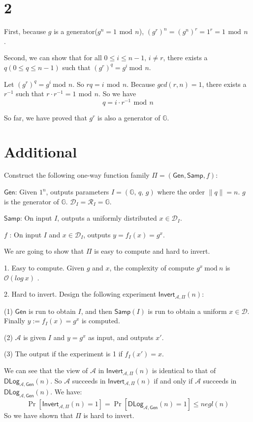 \documentclass[a4papers]{ctexart}
\newcommand{\mc}[1]{\mathcal{#1}}
\newcommand{\mr}[1]{\ \mathrm{#1}\ }
\newcommand{\mb}[1]{\mathbb{#1}}
\begin{document}
\section*{2}
First, because $g$ is a generator($g^n = 1\, \mr{mod}\, n $), $(g^r)^n = (g^n)^r = 1^r = 1\, \mr{mod}\, n$ .

Second, we can show that for all $0\le i \le n-1,\, i\ne r$, there exists a $q(0\le q \le n-1)$ such that $(g^r)^q = g^i \mr{mod}\, n$.

Let $(g^r)^q = g^i \mr{mod}\, n$. So $rq = i\, \mr{mod}\, n$. Because $gcd(r,n)=1$, there exists a $r^{-1}$
such that $r\cdot r^{-1} = 1\, \mr{mod}\, n$. So we have
\[ q = i\cdot r^{-1} \, \mr{mod}\, n\]

So far, we have proved that $g^r$ is also a generator of $\mathbb{G}$.

\section*{Additional}
\noindent Construct the following one-way function family 
$\Pi = (\mathsf{Gen},\mathsf{Samp},f)$:

$\mathsf{Gen}$: Given $1^n$, outputs parameters $I=(\mb{G},\, q,\, g)$ where the order $\lVert q \rVert = n$. $g$ is the generator of $\mb{G}$.
$\mc{D}_I = \mc{R}_I = \mb{G}.$

$\mathsf{Samp}$: On input $I$, outputs a uniformly distributed $x\in \mc{D}_I$. 

$f$ : On input $I$ and $x\in \mc{D}_I$, outputs $y=f_I(x) = g^x$.

\noindent We are going to show that $\Pi$ is easy to compute and hard to invert.

1. Easy to compute. Given $g$ and $x$, the complexity of compute $g^x \mr{mod} n$ is $\mc{O}(log\ x)$ .

2. Hard to invert. Design the following experiment 
$\mathsf{Invert}_{\mc{A},\Pi}(n)$:

(1) $\mathsf{Gen}$ is run to obtain $I$, and then $\mathsf{Samp}(I)$ is run to obtain a uniform $x \in \mc{D}$.
Finally $y:=f_I(x) = g^x$ is computed.

(2) $\mc{A}$ is given $I$ and $y = g^x$ as input, and outputs $x'$.

(3) The output if the experiment is 1 if $f_I(x')=x$.

\noindent We can see that the view of $\mc{A}$ in $\mathsf{Invert}_{\mc{A},\Pi}(n)$ is identical to that of 
$\mathsf{DLog}_{\mc{A},\mathsf{Gen}}(n)$. So $\mc{A}$ succeeds in $\mathsf{Invert}_{\mc{A},\Pi}(n)$
if and only if $\mc{A}$ succeeds in $\mathsf{DLog}_{\mc{A},\mathsf{Gen}}(n)$. We have:
\[\Pr[\mathsf{Invert}_{\mc{A},\Pi}(n)=1] 
= \Pr[\mathsf{DLog}_{\mc{A},\mathsf{Gen}}(n)=1] \le negl(n)\]
So we have shown that $\Pi$ is hard to invert.
\end{document}
